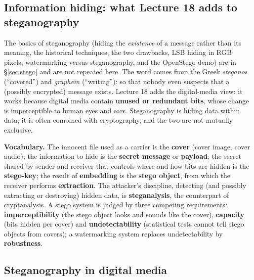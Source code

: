 \subsection{Information hiding: what Lecture 18 adds to steganography \new}

The basics of steganography (hiding the \emph{existence} of a message rather than its meaning, the historical techniques, the two drawbacks, LSB hiding in RGB pixels, watermarking versus steganography, and the OpenStego demo) are in \S\ref{sec:stego} and are not repeated here. The word comes from the Greek \emph{steganos} (``covered'') and \emph{graphein} (``writing''):  so that nobody even suspects that a (possibly encrypted) message exists. Lecture 18 adds the digital-media view: it works because digital media contain \textbf{unused or redundant bits}, whose change is imperceptible to human eyes and ears. Steganography is hiding data within data; it is often combined with cryptography, and the two are not mutually exclusive.

\textbf{Vocabulary.} The innocent file used as a carrier is the \textbf{cover} (cover image, cover audio); the information to hide is the \textbf{secret message} or \textbf{payload}; the secret shared by sender and receiver that controls where and how bits are hidden is the \textbf{stego-key}; the result of \textbf{embedding} is the \textbf{stego object}, from which the receiver performs \textbf{extraction}. The attacker's discipline, detecting (and possibly extracting or destroying) hidden data, is \textbf{steganalysis}, the counterpart of cryptanalysis. A stego system is judged by three competing requirements: \textbf{imperceptibility} (the stego object looks and sounds like the cover), \textbf{capacity} (bits hidden per cover) and \textbf{undetectability} (statistical tests cannot tell stego objects from covers); a watermarking system replaces undetectability by \textbf{robustness}.

\subsection{Steganography in digital media \new}

